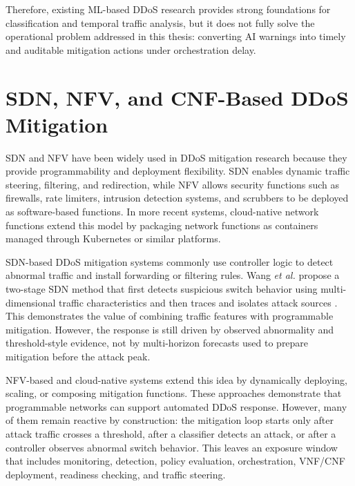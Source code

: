 \documentclass[12pt, a4paper, reqno, oneside]{book}
\begin{document}
Therefore, existing ML-based DDoS research provides strong foundations for
classification and temporal traffic analysis, but it does not fully solve the
operational problem addressed in this thesis: converting AI warnings into
timely and auditable mitigation actions under orchestration delay.

\section{SDN, NFV, and CNF-Based DDoS Mitigation}
\label{sec:related-sdn-nfv}

SDN and NFV have been widely used in DDoS mitigation research because they
provide programmability and deployment flexibility. SDN enables dynamic traffic
steering, filtering, and redirection, while NFV allows security functions such
as firewalls, rate limiters, intrusion detection systems, and scrubbers to be
deployed as software-based functions. In more recent systems, cloud-native
network functions extend this model by packaging network functions as
containers managed through Kubernetes or similar platforms.

SDN-based DDoS mitigation systems commonly use controller logic to detect
abnormal traffic and install forwarding or filtering rules. Wang
\textit{et al.} propose a two-stage SDN method that first detects suspicious
switch behavior using multi-dimensional traffic characteristics and then traces
and isolates attack sources \cite{wang2024multidimensional_sdn}. This
demonstrates the value of combining traffic features with programmable
mitigation. However, the response is still driven by observed abnormality and
threshold-style evidence, not by multi-horizon forecasts used to prepare
mitigation before the attack peak.

NFV-based and cloud-native systems extend this idea by dynamically deploying,
scaling, or composing mitigation functions. These approaches demonstrate that
programmable networks can support automated DDoS response. However, many of
them remain reactive by construction: the mitigation loop starts only after
attack traffic crosses a threshold, after a classifier detects an attack, or
after a controller observes abnormal switch behavior. This leaves an exposure
window that includes monitoring, detection, policy evaluation, orchestration,
VNF/CNF deployment, readiness checking, and traffic steering.
\end{document}
